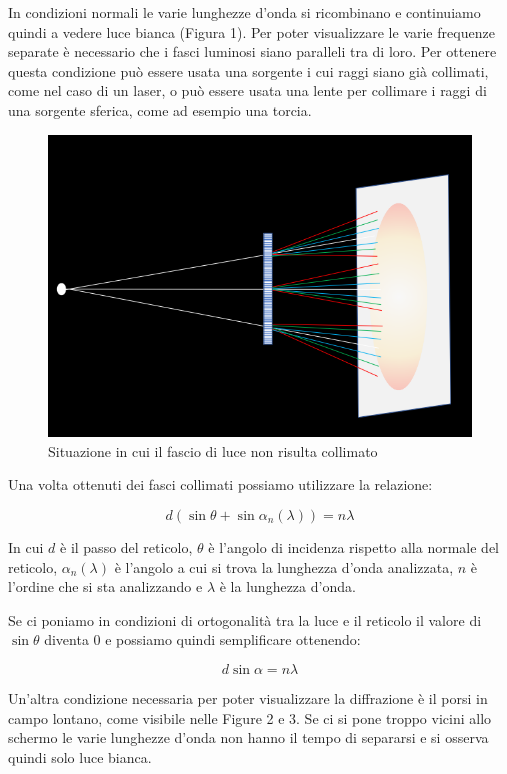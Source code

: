 \documentclass{article}
\begin{document}
In condizioni normali le varie lunghezze d'onda si ricombinano e continuiamo quindi a vedere luce bianca (Figura 1). Per poter visualizzare le varie frequenze separate è necessario che i fasci luminosi siano paralleli tra di loro. Per ottenere questa condizione può essere usata una sorgente i cui raggi siano già collimati, come nel caso di un laser, o può essere usata una lente per collimare i raggi di una sorgente sferica, come ad esempio una torcia.


\begin{figure}[h!]
  \centering
  \includegraphics[width=0.4\linewidth]{IM reticolo non collimato}
  \caption{Situazione in cui il fascio di luce non risulta collimato}
\end{figure}


Una volta ottenuti dei fasci collimati possiamo utilizzare la relazione:

\begin{equation}
d (\sin \theta + \sin \alpha_n(\lambda)) = n \lambda
\end{equation}

In cui $d$ è il passo del reticolo, $\theta$ è l'angolo di incidenza rispetto alla normale del reticolo, $\alpha_n(\lambda)$ è l'angolo a cui si trova la lunghezza d'onda analizzata, $n$ è l'ordine che si sta analizzando e $\lambda$ è la lunghezza d'onda.

\vspace{3mm}

Se ci poniamo in condizioni di ortogonalità tra la luce e il reticolo il valore di $\sin \theta$ diventa 0 e possiamo quindi semplificare ottenendo:

\begin{equation}
d \sin \alpha = n \lambda
\end{equation}

Un'altra condizione necessaria per poter visualizzare la diffrazione è il porsi in campo lontano, come visibile nelle Figure 2 e 3. Se ci si pone troppo vicini allo schermo le varie lunghezze d'onda non hanno il tempo di separarsi e si osserva quindi solo luce bianca. 
\end{document}
